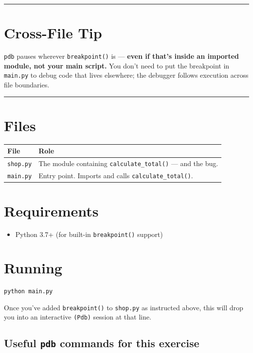 \documentclass[11pt]{article}
\newcommand{\horizrule}{\noindent\rule{\textwidth}{0.4pt}}
\begin{document}
\horizrule

\section*{Cross-File Tip}

\texttt{pdb} pauses wherever \texttt{breakpoint()} is --- \textbf{even if that's inside an imported module, not your main script.} You don't need to put the breakpoint in \texttt{main.py} to debug code that lives elsewhere; the debugger follows execution across file boundaries.

\horizrule

\section*{Files}

\begin{center}
\begin{tabular}{ll}
\toprule
File & Role \\
\midrule
\texttt{shop.py} & The module containing \texttt{calculate\_total()} --- and the bug. \\
\texttt{main.py} & Entry point. Imports and calls \texttt{calculate\_total()}. \\
\bottomrule
\end{tabular}
\end{center}

\section*{Requirements}

\begin{itemize}[leftmargin=*]
    \item Python 3.7+ (for built-in \texttt{breakpoint()} support)
\end{itemize}

\section*{Running}

\begin{lstlisting}[style=shellstyle]
python main.py
\end{lstlisting}

\noindent Once you've added \texttt{breakpoint()} to \texttt{shop.py} as instructed above, this will drop you into an interactive \texttt{(Pdb)} session at that line.

\subsection*{Useful \texttt{pdb} commands for this exercise}
\end{document}
